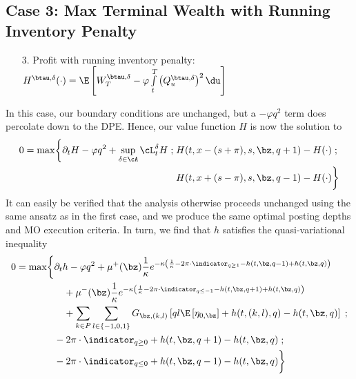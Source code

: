 \documentclass[12pt]{article}
\begin{document}
\subsection*{Case 3: Max Terminal Wealth with Running Inventory Penalty}
\begin{enumerate}[noitemsep, topsep=0pt]
\item[3.] Profit with running inventory penalty: $H^{\btau, \delta}(\cdot) = \E \left[  W_T^{\btau, \delta}  - \varphi \int\limits_t^T \left( Q^{\btau, \delta}_u \right)^2 \du  \right]$
\end{enumerate}
In this case, our boundary conditions are unchanged, but a $-\varphi q^2$ term does percolate down to the DPE. Hence, our value function $H$ is now the solution to
\begin{equation}
\label{eq:DPEcase3}
\begin{split}
0 = \max \biggl\lbrace \partial_t H - \varphi q^2 + \sup \limits_{\delta \in \cA} \cL^{\delta}_t H \; ; \; & H(t,x-(s+\pi), s, \bz, q+1) - H(\cdot) \; ; \\
&  H(t,x+(s-\pi), s, \bz, q-1) - H(\cdot) \biggr\rbrace
\end{split}
\end{equation}
It can easily be verified that the analysis otherwise proceeds unchanged using the same ansatz as in the first case, and we produce the same optimal posting depths and MO execution criteria. In turn, we find that $h$ satisfies the quasi-variational inequality
\begin{equation}\label{eq:PDEcase3}
\begin{split}
0 = \max \biggl\lbrace & \partial_t h -\varphi q^2 + \mu^+(\bz) \frac{1}{\kappa} e^{ -\kappa \left( \frac{1}{\kappa} - 2 \pi \cdot \indicator_{q \geq 1} - h(t,\bz,q-1) + h(t,\bz,q)  \right)} \\
& \quad + \mu^-(\bz) \frac{1}{\kappa} e^{ -\kappa \left( \frac{1}{\kappa} - 2 \pi \cdot \indicator_{q \leq -1} - h(t,\bz,q+1) + h(t,\bz,q) \right)} \\
& \quad + \sum_{k\in P} \sum_{l \in \{-1,0,1\}} G_{\bz,(k,l)} \left[ ql \E \left[ \eta_{0,\bz} \right] + h(t,(k,l),q) - h(t,\bz,q) \right] \; ; \\
& -2 \pi \cdot \indicator_{q \geq 0} + h(t, \bz, q+1) - h(t,\bz,q)   \; ; \\
& -2 \pi \cdot \indicator_{q \leq 0} + h(t, \bz, q-1) - h(t,\bz,q)  \biggr\rbrace
\end{split}
\end{equation}
\end{document}
